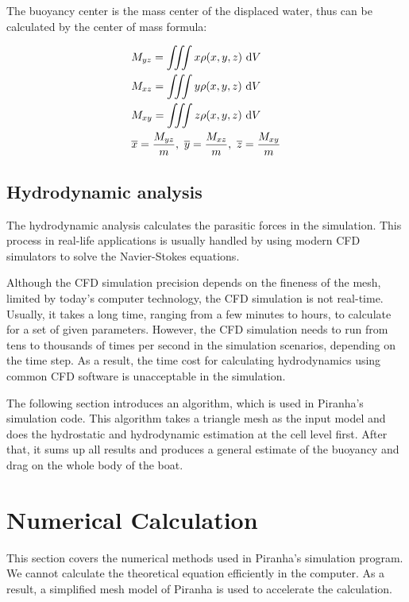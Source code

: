 The buoyancy center is the mass center of the displaced water, thus can be calculated by the center of mass formula:

\begin{align}
    & M_{yz} =\iiint x\rho(x,y,z)\ {\rm d}V \\
    & M_{xz} =\iiint y\rho(x,y,z)\ {\rm d}V \\
    & M_{xy} =\iiint z\rho(x,y,z)\ {\rm d}V \\
    & \overline{x} =\frac{M_{yz}}{m},\ \overline{y} =\frac{M_{xz}}{m},\ \overline{z} =\frac{M_{xy}}{m}
\end{align}

\subsection{Hydrodynamic analysis}

The hydrodynamic analysis calculates the parasitic forces in the simulation. This process in real-life applications is usually handled by using modern CFD simulators to solve the Navier-Stokes equations. 

Although the CFD simulation precision depends on the fineness of the mesh, limited by today's computer technology, the CFD simulation is not real-time. Usually, it takes a long time, ranging from a few minutes to hours, to calculate for a set of given parameters. However, the CFD simulation needs to run from tens to thousands of times per second in the simulation scenarios, depending on the time step. As a result, the time cost for calculating hydrodynamics using common CFD software is unacceptable in the simulation.

The following section introduces an algorithm, which is used in Piranha's simulation code. This algorithm takes a triangle mesh as the input model and does the hydrostatic and hydrodynamic estimation at the cell level first. After that, it sums up all results and produces a general estimate of the buoyancy and drag on the whole body of the boat.

\section{Numerical Calculation}

This section covers the numerical methods used in Piranha's simulation program. We cannot calculate the theoretical equation efficiently in the computer. As a result, a simplified mesh model of Piranha is used to accelerate the calculation.

